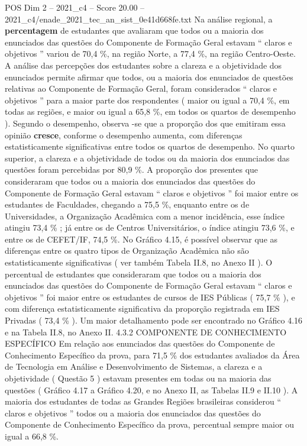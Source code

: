 \begin{textsample}{POS Dim 2 – 2021\_c4 – Score 20.00 – 2021\_c4/enade\_2021\_tec\_an\_sist\_0e41d668fe.txt}
Na análise regional, a \textbf{percentagem} de estudantes que avaliaram que todos ou a maioria dos enunciados das questões do Componente de Formação Geral estavam “ claros e objetivos ” variou de 70,4 \%, na região Norte, a 77,4 \%, na região Centro-Oeste.
A análise das percepções dos estudantes sobre a clareza e a objetividade dos enunciados permite afirmar que todos, ou a maioria dos enunciados de questões relativas ao Componente de Formação Geral, foram considerados “ claros e objetivos ” para a maior parte dos respondentes ( maior ou igual a 70,4 \%, em todas as regiões, e maior ou igual a 65,8 \%, em todos os quartos de desempenho ).
Segundo o desempenho, observa -se que a proporção dos que emitiram essa opinião \textbf{cresce}, conforme o desempenho aumenta, com diferenças estatisticamente significativas entre todos os quartos de desempenho.
No quarto superior, a clareza e a objetividade de todos ou da maioria dos enunciados das questões foram percebidas por 80,9 \%.
A proporção dos presentes que consideraram que todos ou a maioria dos enunciados das questões do Componente de Formação Geral estavam “ claros e objetivos ” foi maior entre os estudantes de Faculdades, chegando a 75,5 \%, enquanto entre os de Universidades, a Organização Acadêmica com a menor incidência, esse índice atingiu 73,4 \% ; já entre os de Centros Universitários, o índice atingiu 73,6 \%, e entre os de CEFET/IF, 74,5 \%.
No Gráfico 4.15, é possível observar que as diferenças entre os quatro tipos de Organização Acadêmica não são estatisticamente significativas ( ver também Tabela II.8, no Anexo II ).
O percentual de estudantes que consideraram que todos ou a maioria dos enunciados das questões do Componente de Formação Geral estavam “ claros e objetivos ” foi maior entre os estudantes de cursos de IES Públicas ( 75,7 \% ), e com diferença estatisticamente significativa da proporção registrada em IES Privadas ( 73,4 \% ).
Um maior detalhamento pode ser encontrado no Gráfico 4.16 e na Tabela II.8, no Anexo II. 4.3.2 COMPONENTE DE CONHECIMENTO ESPECÍFICO Em relação aos enunciados das questões do Componente de Conhecimento Específico da prova, para 71,5 \% dos estudantes avaliados da Área de Tecnologia em Análise e Desenvolvimento de Sistemas, a clareza e a objetividade ( Questão 5 ) estavam presentes em todas ou na maioria das questões ( Gráfico 4.17 a Gráfico 4.20, e no Anexo II, as Tabelas II.9 e II.10 ).
A maioria dos estudantes de todas as Grandes Regiões brasileiras considerou “ claros e objetivos ” todos ou a maioria dos enunciados das questões do Componente de Conhecimento Específico da prova, percentual sempre maior ou igual a 66,8 \%.

\end{textsample}
